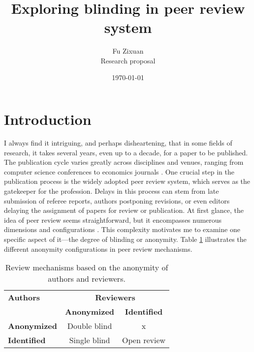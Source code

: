 \documentclass[12pt]{article}
\title{Exploring blinding in peer review system}
\author{Fu Zixuan \\{\small {Research proposal}}}
\date{\today}
\begin{document}
\maketitle




\section{Introduction}
I always find it intriguing, and perhaps disheartening, that in some fields of
research, it takes several years, even up to a decade, for a paper to be
published. The publication cycle varies greatly across disciplines and venues,
ranging from computer science conferences to economics journals
\cite{hadavand2024publishing}. One crucial step in the publication process is
the widely adopted peer review system, which serves as the gatekeeper for the
profession. Delays in this process can stem from late submission of referee
reports, authors postponing revisions, or even editors delaying the assignment
of papers for review or publication. At first glance, the idea of peer review
seems straightforward, but it encompasses numerous dimensions and
configurations \cite{soergel2013open}. This complexity motivates me to examine
one specific aspect of it—the degree of blinding or anonymity. Table
\ref{tab:review_mechanism} illustrates the different anonymity configurations
in peer review mechanisms.

\begin{table}[h!]
    \centering
    \begin{tabular}{lcc}
        \toprule
        \textbf{Authors}    & \multicolumn{2}{c}{\textbf{Reviewers}}                       \\ \cmidrule(lr){2-3}
                            & \textbf{Anonymized}                    & \textbf{Identified} \\ \midrule
        \textbf{Anonymized} & Double blind                           & x                   \\
        \textbf{Identified} & Single blind                           & Open review         \\ \bottomrule
    \end{tabular}
    \caption{Review mechanisms based on the anonymity of authors and reviewers.}
    \label{tab:review_mechanism}
\end{table}
\end{document}
